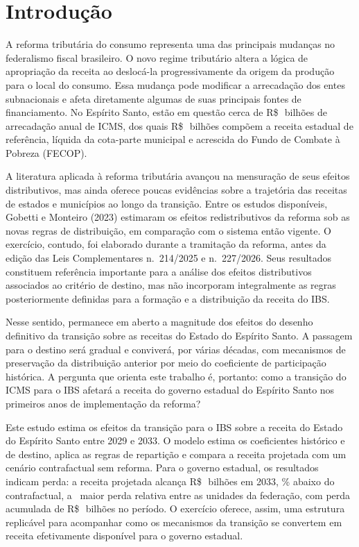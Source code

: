 \documentclass[12pt,a4paper]{article}
\newcommand{\Rs}{R\$\,}
\newcommand{\nn}{n.\textordmasculine}
\begin{document}
\section{Introdução}

A reforma tributária do consumo representa uma das principais mudanças no federalismo fiscal brasileiro. O novo regime tributário altera a lógica de apropriação da receita ao deslocá-la progressivamente da origem da produção para o local do consumo. Essa mudança pode modificar a arrecadação dos entes subnacionais e afeta diretamente algumas de suas principais fontes de financiamento. No Espírito Santo, estão em questão cerca de \Rs\NumIcmsBruto\ bilhões de arrecadação anual de ICMS, dos quais \Rs\NumRecPreArred\ bilhões compõem a receita estadual de referência, líquida da cota-parte municipal e acrescida do Fundo de Combate à Pobreza (FECOP).

A literatura aplicada à reforma tributária avançou na mensuração de seus efeitos distributivos, mas ainda oferece poucas evidências sobre a trajetória das receitas de estados e municípios ao longo da transição. Entre os estudos disponíveis, Gobetti e Monteiro (2023) estimaram os efeitos redistributivos da reforma sob as novas regras de distribuição, em comparação com o sistema então vigente. O exercício, contudo, foi elaborado durante a tramitação da reforma, antes da edição das Leis Complementares \nn~214/2025 e \nn~227/2026. Seus resultados constituem referência importante para a análise dos efeitos distributivos associados ao critério de destino, mas não incorporam integralmente as regras posteriormente definidas para a formação e a distribuição da receita do IBS.

Nesse sentido, permanece em aberto a magnitude dos efeitos do desenho definitivo da transição sobre as receitas do Estado do Espírito Santo. A passagem para o destino será gradual e conviverá, por várias décadas, com mecanismos de preservação da distribuição anterior por meio do coeficiente de participação histórica. A pergunta que orienta este trabalho é, portanto: como a transição do ICMS para o IBS afetará a receita do governo estadual do Espírito Santo nos primeiros anos de implementação da reforma?

Este estudo estima os efeitos da transição para o IBS sobre a receita do Estado do Espírito Santo entre 2029 e 2033. O modelo estima os coeficientes histórico e de destino, aplica as regras de repartição e compara a receita projetada com um cenário contrafactual sem reforma. Para o governo estadual, os resultados indicam perda: a receita projetada alcança \Rs\NumPosCinco\ bilhões em 2033, \NumVarFinalUma\% abaixo do contrafactual, a \NumRank\textordfeminine\ maior perda relativa entre as unidades da federação, com perda acumulada de \Rs\NumDifAcum\ bilhões no período. O exercício oferece, assim, uma estrutura replicável para acompanhar como os mecanismos da transição se convertem em receita efetivamente disponível para o governo estadual.
\end{document}
